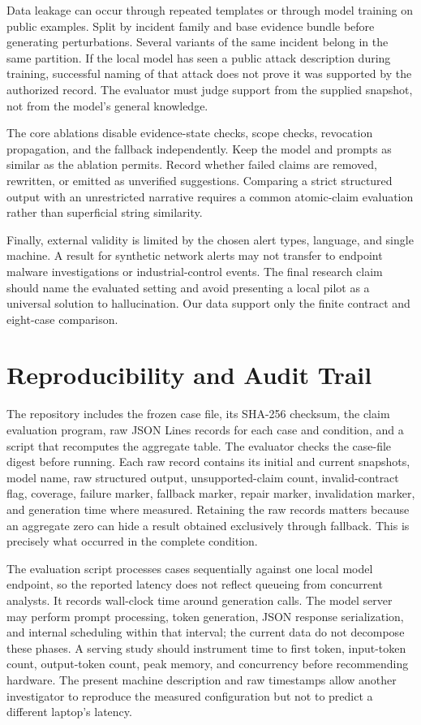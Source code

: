 Data leakage can occur through repeated templates or through model training on public examples. Split by incident family and base evidence bundle before generating perturbations. Several variants of the same incident belong in the same partition. If the local model has seen a public attack description during training, successful naming of that attack does not prove it was supported by the authorized record. The evaluator must judge support from the supplied snapshot, not from the model's general knowledge.

The core ablations disable evidence-state checks, scope checks, revocation propagation, and the fallback independently. Keep the model and prompts as similar as the ablation permits. Record whether failed claims are removed, rewritten, or emitted as unverified suggestions. Comparing a strict structured output with an unrestricted narrative requires a common atomic-claim evaluation rather than superficial string similarity.

Finally, external validity is limited by the chosen alert types, language, and single machine. A result for synthetic network alerts may not transfer to endpoint malware investigations or industrial-control events. The final research claim should name the evaluated setting and avoid presenting a local pilot as a universal solution to hallucination. Our data support only the finite contract and eight-case comparison.

\section{Reproducibility and Audit Trail}
The repository includes the frozen case file, its SHA-256 checksum, the claim evaluation program, raw JSON Lines records for each case and condition, and a script that recomputes the aggregate table. The evaluator checks the case-file digest before running. Each raw record contains its initial and current snapshots, model name, raw structured output, unsupported-claim count, invalid-contract flag, coverage, failure marker, fallback marker, repair marker, invalidation marker, and generation time where measured. Retaining the raw records matters because an aggregate zero can hide a result obtained exclusively through fallback. This is precisely what occurred in the complete condition.

The evaluation script processes cases sequentially against one local model endpoint, so the reported latency does not reflect queueing from concurrent analysts. It records wall-clock time around generation calls. The model server may perform prompt processing, token generation, JSON response serialization, and internal scheduling within that interval; the current data do not decompose these phases. A serving study should instrument time to first token, input-token count, output-token count, peak memory, and concurrency before recommending hardware. The present machine description and raw timestamps allow another investigator to reproduce the measured configuration but not to predict a different laptop's latency.


